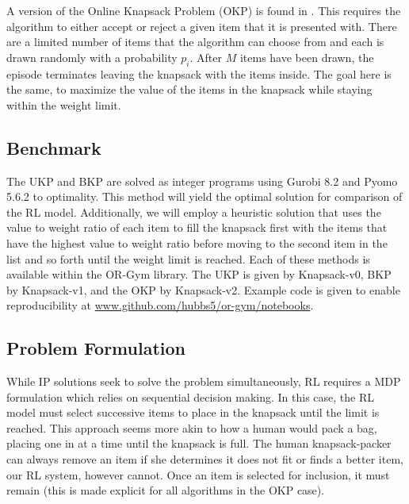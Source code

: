 \documentclass[12pt]{article}
\begin{document}
A version of the Online Knapsack Problem (OKP) is found in \citet{Kong2019}.
This requires the algorithm to either accept or reject a given item that it is presented with.
There are a limited number of items that the algorithm can choose from and each is drawn randomly with a probability $p_i$. 
After $M$ items have been drawn, the episode terminates leaving the knapsack with the items inside.
The goal here is the same, to maximize the value of the items in the knapsack while staying within the weight limit.


\subsection{Benchmark}

The UKP and BKP are solved as integer programs using Gurobi 8.2 and Pyomo 5.6.2 to optimality.
This method will yield the optimal solution for comparison of the RL model. 
Additionally, we will employ a heuristic solution that uses the value to weight ratio of each item to fill the knapsack first with the items that have the highest value to weight ratio before moving to the second item in the list and so forth until the weight limit is reached.
Each of these methods is available within the OR-Gym library.
The UKP is given by Knapsack-v0, BKP by Knapsack-v1, and the OKP by Knapsack-v2. 
Example code is given to enable reproducibility at \href{www.github.com/hubbs5/or-gym/notebooks}{www.github.com/hubbs5/or-gym/notebooks}.

\subsection{Problem Formulation}

While IP solutions seek to solve the problem simultaneously, RL requires a MDP formulation which relies on sequential decision making.
In this case, the RL model must select successive items to place in the knapsack until the limit is reached.
This approach seems more akin to how a human would pack a bag, placing one in at a time until the knapsack is full.
The human knapsack-packer can always remove an item if she determines it does not fit or finds a better item, our RL system, however cannot.
Once an item is selected for inclusion, it must remain (this is made explicit for all algorithms in the OKP case).
\end{document}
